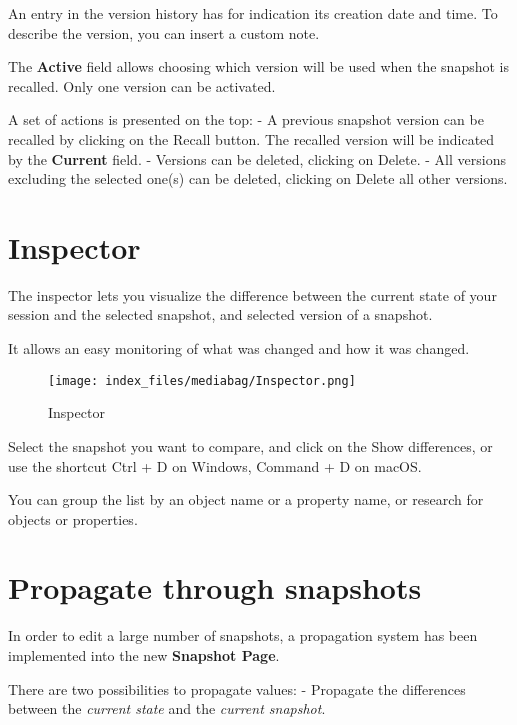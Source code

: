 \documentclass[
  letterpaper,
  DIV=11,
  numbers=noendperiod]{scrreport}
\begin{document}
An entry in the version history has for indication its creation date and
time. To describe the version, you can insert a custom note.

The \textbf{Active} field allows choosing which version will be used
when the snapshot is recalled. Only one version can be activated.

A set of actions is presented on the top: - A previous snapshot version
can be recalled by clicking on the Recall button. The recalled version
will be indicated by the \textbf{Current} field. - Versions can be
deleted, clicking on Delete. - All versions excluding the selected
one(s) can be deleted, clicking on Delete all other versions.

\hypertarget{inspector}{%
\section{Inspector}\label{inspector}}

The inspector lets you visualize the difference between the current
state of your session and the selected snapshot, and selected version of
a snapshot.

It allows an easy monitoring of what was changed and how it was changed.

\begin{figure}

{\centering \texttt{[image: index\_files/mediabag/Inspector.png]}

}

\caption{Inspector}

\end{figure}

Select the snapshot you want to compare, and click on the Show
differences, or use the shortcut Ctrl + D on Windows, Command + D on
macOS.

You can group the list by an object name or a property name, or research
for objects or properties.

\hypertarget{propagate-through-snapshots}{%
\section{Propagate through
snapshots}\label{propagate-through-snapshots}}

In order to edit a large number of snapshots, a propagation system has
been implemented into the new \textbf{Snapshot Page}.

There are two possibilities to propagate values: - Propagate the
differences between the \emph{current state} and the \emph{current
snapshot}.
\end{document}
